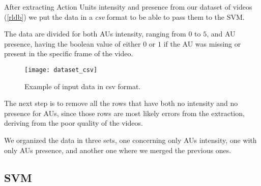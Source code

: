 After extracting Action Units intensity and presence from our dataset of videos (\ref{rldb}) we put the data in a \textit{csv} format to be able to pass them to the SVM. 

The data are divided for both AUs intensity, ranging from $0$ to $5$, and AU presence, having the boolean value of either $0$ or $1$ if the AU was missing or present in the specific frame of the video.

\begin{figure}[H]
	\centering
	\texttt{[image: dataset\_csv]}
	\caption{Example of input data in csv format.}
	\label{fig:dataset_csv}
\end{figure}

The next step is to remove all the rows that have both no intensity and no presence for AUs, since those rows are most likely errors from the extraction, deriving from the poor quality of the videos.

We organized the data in three sets, one concerning only AUs intensity, one with only AUs presence, and another one where we merged the previous ones.

\subsection{SVM}


